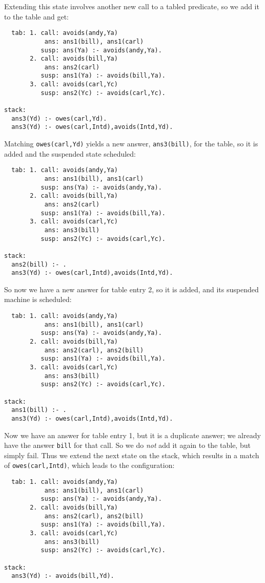 Extending this state involves another new call to a tabled predicate,
so we add it to the table and get:
\begin{verbatim}
  tab: 1. call: avoids(andy,Ya)
           ans: ans1(bill), ans1(carl)
          susp: ans(Ya) :- avoids(andy,Ya).
       2. call: avoids(bill,Ya)
           ans: ans2(carl)
          susp: ans1(Ya) :- avoids(bill,Ya).
       3. call: avoids(carl,Yc)
          susp: ans2(Yc) :- avoids(carl,Yc).

stack:
  ans3(Yd) :- owes(carl,Yd).
  ans3(Yd) :- owes(carl,Intd),avoids(Intd,Yd).
\end{verbatim}
Matching \verb|owes(carl,Yd)| yields a new answer, \verb|ans3(bill)|,
for the table, so it is added and the suspended state scheduled:
\begin{verbatim}
  tab: 1. call: avoids(andy,Ya)
           ans: ans1(bill), ans1(carl)
          susp: ans(Ya) :- avoids(andy,Ya).
       2. call: avoids(bill,Ya)
           ans: ans2(carl)
          susp: ans1(Ya) :- avoids(bill,Ya).
       3. call: avoids(carl,Yc)
           ans: ans3(bill)
          susp: ans2(Yc) :- avoids(carl,Yc).

stack:
  ans2(bill) :- .
  ans3(Yd) :- owes(carl,Intd),avoids(Intd,Yd).
\end{verbatim}
So now we have a new answer for table entry 2, so it is added, and its
suspended machine is scheduled:
\begin{verbatim}
  tab: 1. call: avoids(andy,Ya)
           ans: ans1(bill), ans1(carl)
          susp: ans(Ya) :- avoids(andy,Ya).
       2. call: avoids(bill,Ya)
           ans: ans2(carl), ans2(bill)
          susp: ans1(Ya) :- avoids(bill,Ya).
       3. call: avoids(carl,Yc)
           ans: ans3(bill)
          susp: ans2(Yc) :- avoids(carl,Yc).

stack:
  ans1(bill) :- .
  ans3(Yd) :- owes(carl,Intd),avoids(Intd,Yd).
\end{verbatim}
Now we have an answer for table entry 1, but it is a duplicate answer;
we already have the answer \verb|bill| for that call.  So we do {\em not}
add it again to the table, but simply fail.  Thus we extend the next
state on the stack, which results in a match of
\verb|owes(carl,Intd)|, which leads to the configuration:
\begin{verbatim}
  tab: 1. call: avoids(andy,Ya)
           ans: ans1(bill), ans1(carl)
          susp: ans(Ya) :- avoids(andy,Ya).
       2. call: avoids(bill,Ya)
           ans: ans2(carl), ans2(bill)
          susp: ans1(Ya) :- avoids(bill,Ya).
       3. call: avoids(carl,Yc)
           ans: ans3(bill)
          susp: ans2(Yc) :- avoids(carl,Yc).

stack:
  ans3(Yd) :- avoids(bill,Yd).
\end{verbatim}
